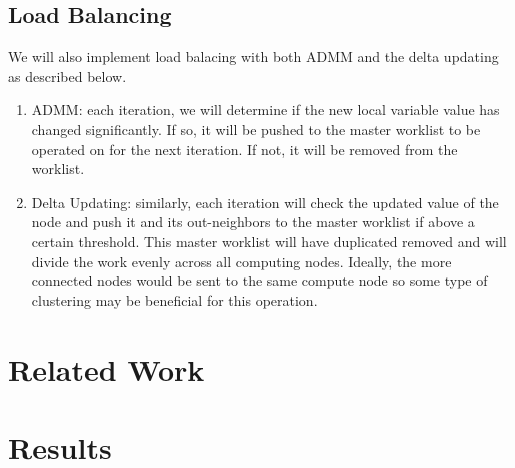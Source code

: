 \documentclass[a4paper,10pt]{article}
\begin{document}
\subsection{Load Balancing}
We will also implement load balacing with both ADMM and the delta updating as described below.

\begin{enumerate}
	\item ADMM: each iteration, we will determine if the new local variable value has changed significantly. If so, it will be pushed to the master worklist to be operated on for the next iteration. If not, it will be removed from the worklist.
	\item Delta Updating: similarly, each iteration will check the updated value of the node and push it and its out-neighbors to the master worklist if above a certain threshold. This master worklist will have duplicated removed and will divide the work evenly across all computing nodes. Ideally, the more connected nodes would be sent to the same compute node so some type of clustering may be beneficial for this operation.
\end{enumerate}

\section{Related Work}


\section{Results}
\end{document}
